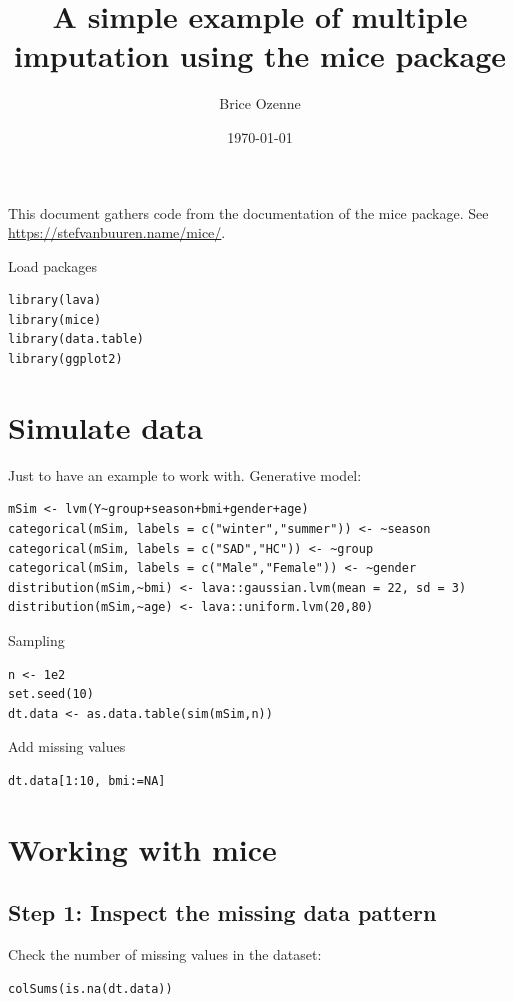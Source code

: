 \documentclass[12pt]{article}
\author{Brice Ozenne}
\date{\today}
\title{A simple example of multiple imputation using the mice package}
\begin{document}
\maketitle
This document gathers code from the documentation of the mice
package. See \url{https://stefvanbuuren.name/mice/}.

\bigskip

Load packages
\lstset{language=r,label= ,caption= ,captionpos=b,numbers=none}
\begin{lstlisting}
library(lava)
library(mice)
library(data.table)
library(ggplot2)
\end{lstlisting}

\section{Simulate data}
\label{sec:org331162c}

Just to have an example to work with. Generative model:
\lstset{language=r,label= ,caption= ,captionpos=b,numbers=none}
\begin{lstlisting}
mSim <- lvm(Y~group+season+bmi+gender+age)
categorical(mSim, labels = c("winter","summer")) <- ~season
categorical(mSim, labels = c("SAD","HC")) <- ~group
categorical(mSim, labels = c("Male","Female")) <- ~gender
distribution(mSim,~bmi) <- lava::gaussian.lvm(mean = 22, sd = 3)
distribution(mSim,~age) <- lava::uniform.lvm(20,80)
\end{lstlisting}

Sampling
\lstset{language=r,label= ,caption= ,captionpos=b,numbers=none}
\begin{lstlisting}
n <- 1e2
set.seed(10)
dt.data <- as.data.table(sim(mSim,n))
\end{lstlisting}

Add missing values
\lstset{language=r,label= ,caption= ,captionpos=b,numbers=none}
\begin{lstlisting}
dt.data[1:10, bmi:=NA]
\end{lstlisting}

\clearpage

\section{Working with mice}
\label{sec:org5085243}

\subsection{Step 1: Inspect the missing data pattern}
\label{sec:org290f310}
Check the number of missing values in the dataset:
\lstset{language=r,label= ,caption= ,captionpos=b,numbers=none}
\begin{lstlisting}
colSums(is.na(dt.data))
\end{lstlisting}
\end{document}
